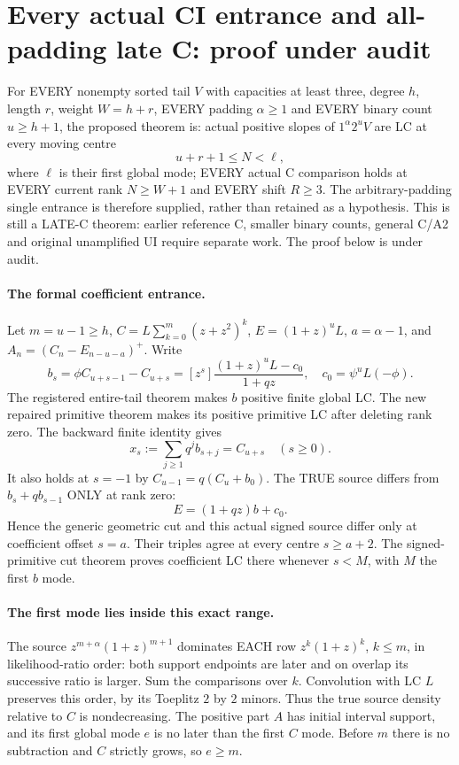 \section{Every actual CI entrance and all-padding late C: proof under audit}
For EVERY nonempty sorted tail $V$ with capacities at least three,
degree $h$, length $r$, weight $W=h+r$, EVERY padding $\alpha\ge1$
and EVERY binary count $u\ge h+1$, the proposed theorem is:
actual positive slopes of $1^\alpha2^uV$ are LC at every moving centre
\[
                            u+r+1\le N<\ell,
\]
where $\ell$ is their first global mode; EVERY actual C comparison
holds at EVERY current rank $N\ge W+1$ and EVERY shift $R\ge3$.
The arbitrary-padding single entrance is therefore supplied, rather
than retained as a hypothesis. This is still a LATE-C theorem:
earlier reference C, smaller binary counts, general C/A2 and original
unamplified UI require separate work. The proof below is under audit.

\paragraph{The formal coefficient entrance.}
Let $m=u-1\ge h$, $C=L\sum_{k=0}^m(z+z^2)^k$,
$E=(1+z)^uL$, $a=\alpha-1$, and
$A_n=(C_n-E_{n-u-a})^+$. Write
\[
 b_s=\phi C_{u+s-1}-C_{u+s}
   =[z^s]\frac{(1+z)^uL-c_0}{1+qz},\quad
                  c_0=\psi^uL(-\phi).
\]
The registered entire-tail theorem makes $b$ positive finite global
LC. The new repaired primitive theorem makes its positive primitive
LC after deleting rank zero. The backward finite identity gives
\[
 x_s:=\sum_{j\ge1}q^j b_{s+j}=C_{u+s}\quad(s\ge0).
\]
It also holds at $s=-1$ by $C_{u-1}=q(C_u+b_0)$.
The TRUE source differs from $b_s+qb_{s-1}$ ONLY at rank zero:
\[
                 E=(1+qz)b+c_0.                     \tag{1}
\]
Hence the generic geometric cut and this actual signed source differ
only at coefficient offset $s=a$. Their triples agree at every centre
$s\ge a+2$. The signed-primitive cut theorem proves coefficient LC
there whenever $s<M$, with $M$ the first $b$ mode.

\paragraph{The first mode lies inside this exact range.}
The source $z^{m+\alpha}(1+z)^{m+1}$ dominates EACH row
$z^k(1+z)^k$, $k\le m$, in likelihood-ratio order: both support
endpoints are later and on overlap its successive ratio is larger.
Sum the comparisons over $k$. Convolution with LC $L$ preserves this
order, by its Toeplitz $2$ by $2$ minors. Thus the true source density
relative to $C$ is nondecreasing. The positive part $A$ has initial
interval support, and its first global mode $e$ is no later than the
first $C$ mode. Before $m$ there is no subtraction and $C$ strictly
grows, so $e\ge m$.

